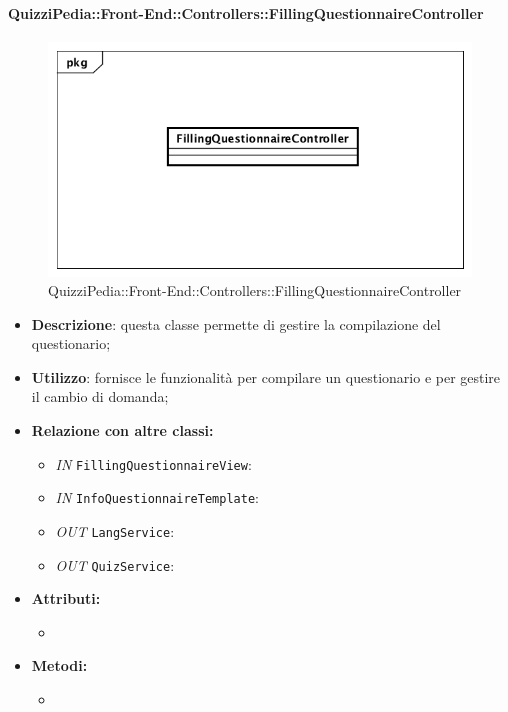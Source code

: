 \paragraph{QuizziPedia::Front-End::Controllers::FillingQuestionnaireController}
\begin{figure}
	\centering
	\includegraphics[scale=0.45]{UML/Classi/Front-End/QuizziPedia_Front-end_Controller_FillingQuestionnaireController.png}
	\caption{QuizziPedia::Front-End::Controllers::FillingQuestionnaireController}
\end{figure}
\begin{itemize}
	\item \textbf{Descrizione}: questa classe permette di gestire la compilazione del questionario;
	\item \textbf{Utilizzo}: fornisce le funzionalità per compilare un questionario e per gestire il cambio di domanda;
	\item \textbf{Relazione con altre classi:}
	\begin{itemize}
		\item \textit{IN} \texttt{FillingQuestionnaireView}:  
		\item \textit{IN} \texttt{InfoQuestionnaireTemplate}: 
		\item \textit{OUT} \texttt{LangService}: 
		\item \textit{OUT} \texttt{QuizService}: 
	\end{itemize}
	\item \textbf{Attributi:}
	\begin{itemize}
		\item 
	\end{itemize}
	\item \textbf{Metodi:}
	\begin{itemize}
		\item 
	\end{itemize}
\end{itemize}

